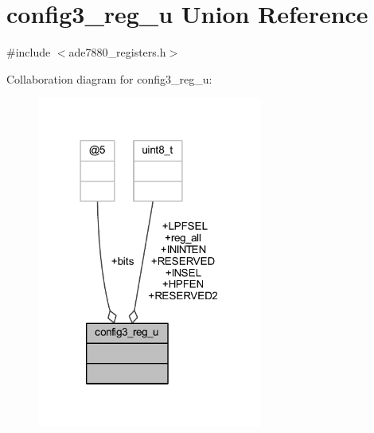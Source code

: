 \hypertarget{a00023}{\section{config3\-\_\-reg\-\_\-u Union Reference}
\label{d3/d52/a00023}
}


{\ttfamily \#include $<$ade7880\-\_\-registers.\-h$>$}



Collaboration diagram for config3\-\_\-reg\-\_\-u\-:\nopagebreak
\begin{figure}[H]
\begin{center}
\leavevmode
\includegraphics[width=210pt]{df/d5d/a00084}
\end{center}
\end{figure}
